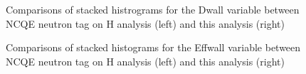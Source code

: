 \begin{figure}[!htbp]
    \centering
    
    \caption{Comparisons of stacked histrograms for the Dwall variable between NCQE neutron tag on H analysis (left) and this analysis (right)} \label{fig:dwall_reduction} 
    
      \hfill 
      \par
    
        
\end{figure}

\begin{figure}[!htbp]
    \centering
    
    \caption{Comparisons of stacked histograms for the Effwall variable between NCQE neutron tag on H analysis (left) and this analysis (right)} \label{fig:effwall_reduction} 
    
      \hfill 
     \par
    
        
\end{figure}

